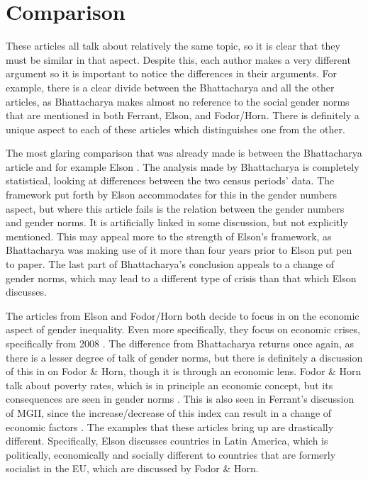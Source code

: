 \documentclass[12pt, letterpaper]{article}
\begin{document}
\section*{Comparison}
These articles all talk about relatively the same topic, so it is clear that they must be similar in that aspect. Despite this, each author makes a very different argument so it is important to notice the differences in their arguments. For example, there is a clear divide between the Bhattacharya and all the other articles, as Bhattacharya makes almost no reference to the social gender norms that are mentioned in both Ferrant, Elson, and Fodor/Horn. There is definitely a unique aspect to each of these articles which distinguishes one from the other.

The most glaring comparison that was already made is between the Bhattacharya article and for example Elson \cite{bhatt,elson}. The analysis made by Bhattacharya is completely statistical, looking at differences between the two census periods' data. The framework put forth by Elson accommodates for this in the gender numbers aspect, but where this article fails is the relation between the gender numbers and gender norms. It is artificially linked in some discussion, but not explicitly mentioned. This may appeal more to the strength of Elson's framework, as Bhattacharya was making use of it more than four years prior to Elson put pen to paper. The last part of Bhattacharya's conclusion appeals to a change of gender norms, which may lead to a different type of crisis than that which Elson discusses.

The articles from Elson and Fodor/Horn both decide to focus in on the economic aspect of gender inequality. Even more specifically, they focus on economic crises, specifically from 2008 \cite{elson,foho}. The difference from Bhattacharya returns once again, as there is a lesser degree of talk of gender norms, but there is definitely a discussion of this in on Fodor \& Horn, though it is through an economic lens. Fodor \& Horn talk about poverty rates, which is in principle an economic concept, but its consequences are seen in gender norms \cite{foho}. This is also seen in Ferrant's discussion of MGII, since the increase/decrease of this index can result in a change of economic factors \cite{ferrant}. The examples that these articles bring up are drastically different. Specifically, Elson discusses countries in Latin America, which is politically, economically and socially different to countries that are formerly socialist in the EU, which are discussed by Fodor \& Horn.
\end{document}
